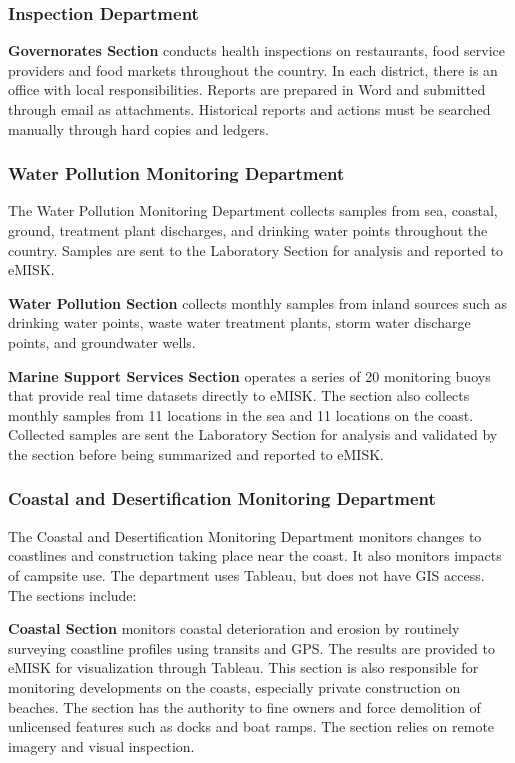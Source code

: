 \subsubsection{Inspection Department}

\textbf{Governorates Section} conducts health inspections on restaurants, food service providers and food markets throughout the country. In each district, there is an office with local responsibilities. Reports are prepared in Word and submitted through email as attachments. Historical reports and actions must be searched manually through hard copies and ledgers.

\subsubsection{Water Pollution Monitoring Department}

The Water Pollution Monitoring Department collects samples from sea, coastal, ground, treatment plant discharges, and drinking water points throughout the country. Samples are sent to the Laboratory Section for analysis and reported to eMISK.

\textbf{Water Pollution Section} collects monthly samples from inland sources such as drinking water points, waste water treatment plants, storm water discharge points, and groundwater wells.

\textbf{Marine Support Services Section} operates a series of 20 monitoring buoys that provide real time datasets directly to eMISK. The section also collects monthly samples from 11 locations in the sea and 11 locations on the coast. Collected samples are sent the Laboratory Section for analysis and validated by the section before being summarized and reported to eMISK.

\subsubsection{Coastal and Desertification Monitoring Department}
The Coastal and Desertification Monitoring Department monitors changes to coastlines and construction taking place near the coast. It also monitors impacts of campsite use. The department uses Tableau, but does not have GIS access.  The sections include:

\textbf{Coastal Section} monitors coastal deterioration and erosion by routinely surveying coastline profiles using transits and GPS. The results are provided to eMISK for visualization through Tableau. This section is also responsible for monitoring developments on the coasts, especially private construction on beaches. The section has the authority to fine owners and force demolition of unlicensed features such as docks and boat ramps. The section relies on remote imagery and visual inspection. 

